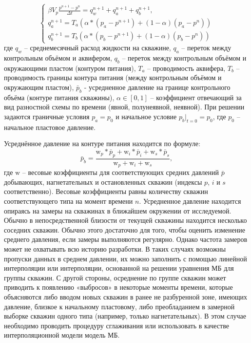 \documentclass[14pt]{article}
\begin{document}
\begin{equation}\label{mb3}
	\begin{cases}
		\beta V_p\frac{p^{n+1} - p^n}{\Delta t} = q_w^{n+1} + q_a^{n+1} + q_b^{n+1},
		\\
		q_a^{n+1} = T_a \left(\alpha*\left(p_a - p^{n+1}\right) + \left(1-\alpha\right)\left(p_a - p^n\right)\right)
		\\
		q_b^{n+1} = T_b \left(\alpha*\left(p_b - p^{n+1}\right) + \left(1-\alpha\right)\left(p_b - p^n\right)\right)
		
	\end{cases}
\end{equation}
где $q_w$ -- среднемесячный расход жидкости на скважине, $q_a$ -- переток между контрольным объёмом и аквифером, $q_b$ -- переток между контрольным объёмом и окружающими пластом (контуром питания), $T_a$ -- проводимость аквифера, $T_b$ -- проводимость границы контура питания (между контрольным объёмом и окружающим пластом), $\bar{p}_b$ - усредненное давление на границе контрольного объёма (контуре питания скважины), $\alpha \in[0,1]$ -- коэффициент отвечающий за вид разностной схемы по времени (явной, полунеявной, неявной). При решении задаются граничные условия $p_a = p_0$ и начальное условие $p_b|_{t=0} = p_0$, где $p_0$ -- начальное пластовое давление.

Усреднённое давление на контуре питания находится по формуле:
\begin{equation}\label{mpc}
	\bar{p}_b = \frac{\mathrm{w}_p*\bar{p}_p + \mathrm{w}_i*\bar{p}_i + \mathrm{w}_s*\bar{p}_s}{\mathrm{w}_p + \mathrm{w}_i + \mathrm{w}_s},
\end{equation}
где $\mathrm{w}$ -- весовые коэффициенты для соответствующих средних давлений $\bar{p}$ добывающих, нагнетательных и остановленных скважин (индексы $p$, $i$ и $s$ соответственно). Весовые коэффициенты равны количеству скважин соответствующего типа на момент времени $n$. Усредненное давление находится опираясь на замеры на скважинах в ближайшем окружении от исследуемой.
Обычно в непосредственной близости от текущей скважины находится несколько соседних скважин. Обычно этого достаточно для того, чтобы оценить изменение среднего давления, если замеры выполняются регулярно. Однако частота замеров может не охватывать всю историю разработки. В таких случаях возможны пропуски данных в среднем давлении, их можно заполнить с помощью линейной интерполяции или интерполяции, основанной на решении уравнения МБ для группы скважин. С другой стороны, осреднение по группе скважин может приводить к появлению «выбросов» в некоторые моменты времени, которые объясняются либо вводом новых скважин в ранее не разбуренной зоне, имеющих давление, близкое к начальному пластовому, либо преобладанием в замерной выборке скважин одного типа (например, только нагнетательных). В этом случае необходимо проводить процедуру сглаживания или использовать в качестве интерполяционной модели модель МБ. 
\end{document}
